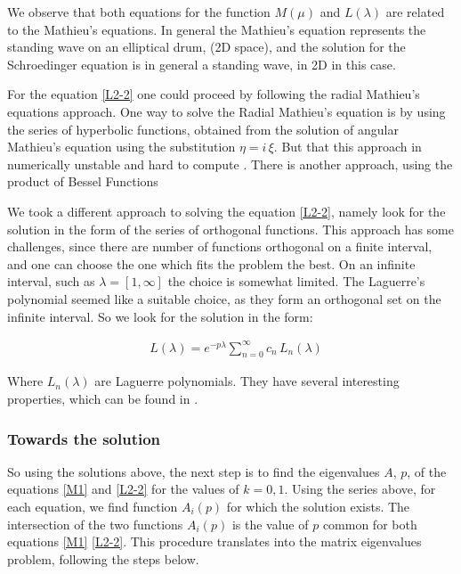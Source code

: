 We observe that both equations for the function $ M(\mu) $ and $ L(\lambda) $ are related to the Mathieu's equations. In general the Mathieu's equation represents the standing wave on an elliptical drum, (2D space),  and the solution for the Schroedinger equation is in general a standing wave, in 2D in this case.

For the equation \eqref{L2-2} one could proceed by following the radial Mathieu's equations approach. One way to solve the Radial Mathieu's equation is by using the series of hyperbolic functions, obtained from the solution of angular Mathieu's equation using the substitution $ \eta = i\,\xi$.  But that this approach in numerically unstable and hard to compute \cite{Mathieu4}. There is another approach, using the product of Bessel Functions \cite{Mathieu4}

We took a different approach to solving the equation \eqref{L2-2}, namely look for the solution in the form of the series of orthogonal functions. This approach has some challenges, since there are number of functions orthogonal on a finite interval, and one can choose the one which fits the problem the best. On an infinite interval, such as $ \lambda = [1, \infty] $ the choice is somewhat limited. The Laguerre's polynomial seemed like a suitable choice, as they form an orthogonal set on the infinite interval. So we look for the solution in the form:

\begin{equation}\label{Lsol1}
\begin{split}
& L(\lambda) =  e^{-p\lambda}\sum_{n=0}^{\infty}{c_n\,L_n(\lambda)}
\end{split}
\end{equation}

Where $ L_n(\lambda) $ are Laguerre polynomials. They have several interesting properties, which can be found in \cite{Laguerre1}.

\subsubsection{ Towards the solution }

So using the solutions above, the next step is to find the eigenvalues $ A $, $ p $, of the equations \eqref{M1} and \eqref{L2-2} for the values of $ k = 0,1 $. Using the series above, for each equation, we find function  $ A_i(p) $ for which the solution exists. The intersection of the two functions $ A_i(p) $ is the value of $ p $ common for both equations \eqref{M1} \eqref{L2-2}. This procedure translates into the matrix eigenvalues problem, following the steps below.

